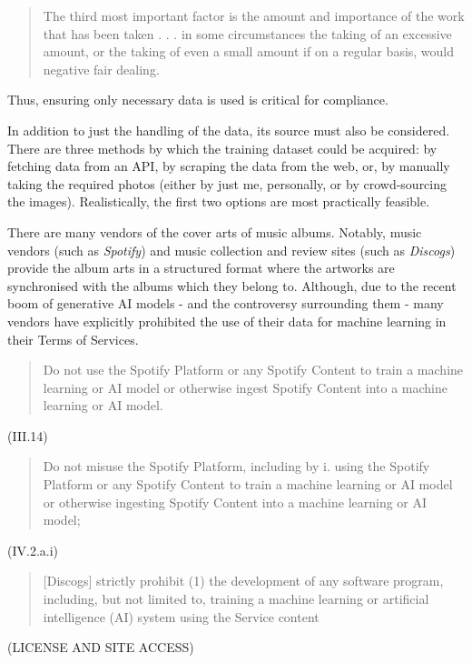                  \begin{quote}
                      The third most important factor is the amount and importance of the work that has been taken . . . in some circumstances the taking of an excessive amount, or the taking of even a small amount if on a regular basis, would negative fair dealing. \cite{tmlocad}
                  \end{quote}
    
                  Thus, ensuring only necessary data is used is critical for compliance.
    
                  In addition to just the handling of the data, its source must also be considered. There are three methods by which the training dataset could be acquired: by fetching data from an API, by scraping the data from the web, or, by manually taking the required photos (either by just me, personally, or by crowd-sourcing the images). Realistically, the first two options are most practically feasible.
    
                  There are many vendors of the cover arts of music albums. Notably, music vendors (such as \textit{Spotify}) and music collection and review sites (such as \textit{Discogs}) provide the album arts in a structured format where the artworks are synchronised with the albums which they belong to. Although, due to the recent boom of generative AI models - and the controversy surrounding them \cite{apnews2025mccartney_ai_warning} - many vendors have explicitly prohibited the use of their data for machine learning in their Terms of Services.
    
                  \begin{quote}
                      Do not use the Spotify Platform or any Spotify Content to train a machine learning or AI model or otherwise ingest Spotify Content into a machine learning or AI model.
                  \end{quote} \cite{spotifyDevPolicy} (III.14)
                  \begin{quote}
                      Do not misuse the Spotify Platform, including by i. using the Spotify Platform or any Spotify Content to train a machine learning or AI model or otherwise ingesting Spotify Content into a machine learning or AI model;
                  \end{quote} \cite{spotifyDevTerms} (IV.2.a.i)
                  \begin{quote}
                      [Discogs] strictly prohibit (1) the development of any software program, including, but not limited to, training a machine learning or artificial intelligence (AI) system using the Service content
                  \end{quote} \cite{discogsToS} (LICENSE AND SITE ACCESS)
    
